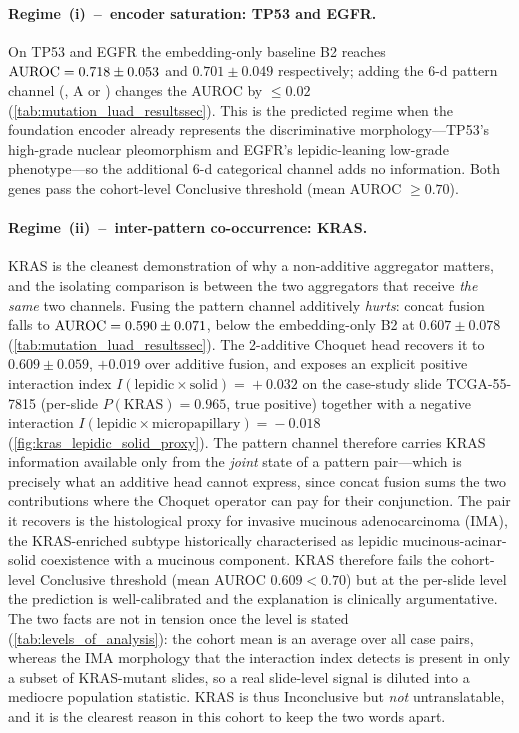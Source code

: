 \paragraph{Regime~(i)~--~encoder saturation: TP53 and EGFR.}
On TP53 and EGFR the embedding-only baseline B2 reaches
$\text{AUROC} = 0.718 \pm 0.053$ and $0.701 \pm 0.049$ respectively;
adding the 6-d pattern channel (\piabmil{}, A or \fcmil{}) changes
the AUROC by $\leq 0.02$ (\cref{tab:mutation_luad_resultssec}).
This is the predicted regime when the \ctranspath{} foundation
encoder already represents the discriminative morphology---TP53's
high-grade nuclear pleomorphism\cite{ahn2022tp53highgrade,mendoza2024tp53nuclear}
and EGFR's lepidic-leaning low-grade phenotype\cite{yoshizawa2013egfrmorph,li2025lepidicgenomics}---so
the additional 6-d categorical channel adds no information.
Both genes pass the cohort-level Conclusive threshold
(mean AUROC $\geq 0.70$).

\paragraph{Regime~(ii)~--~inter-pattern co-occurrence: KRAS.}
KRAS is the cleanest demonstration of why a non-additive aggregator
matters, and the isolating comparison is between the two aggregators
that receive \emph{the same} two channels.
Fusing the pattern channel additively \emph{hurts}: \piabmil{}
concat fusion falls to $\text{AUROC} = 0.590 \pm 0.071$, below the
embedding-only B2 at $0.607 \pm 0.078$
(\cref{tab:mutation_luad_resultssec}).
The 2-additive Choquet head recovers it to $0.609 \pm 0.059$,
${+}0.019$ over additive fusion, and exposes an explicit positive
interaction index
$I(\text{lepidic}\!\times\!\text{solid})\!=\!{+}0.032$ on the
case-study slide TCGA-55-7815 (per-slide
$P(\text{KRAS}) = 0.965$, true positive) together with a negative
interaction
$I(\text{lepidic}\!\times\!\text{micropapillary})\!=\!-0.018$
(\cref{fig:kras_lepidic_solid_proxy}).
The pattern channel therefore carries KRAS information available only
from the \emph{joint} state of a pattern pair---which is precisely
what an additive head cannot express, since concat fusion sums the two
contributions where the Choquet operator can pay for their
conjunction.
The pair it recovers is the histological proxy for invasive mucinous
adenocarcinoma (IMA), the KRAS-enriched subtype historically
characterised as lepidic mucinous-acinar-solid coexistence with a
mucinous component.\cite{shim2015krasmucinous,rekhtman2013krassolid,cha2017imapatterns,hwang2017nonlepidicima}
KRAS therefore fails the cohort-level Conclusive threshold
(mean AUROC $0.609 < 0.70$) but at the per-slide level the
prediction is well-calibrated and the explanation is
clinically argumentative.
The two facts are not in tension once the level is stated
(\cref{tab:levels_of_analysis}): the cohort mean is an average over
all case pairs, whereas the IMA morphology that the interaction
index detects is present in only a subset of KRAS-mutant slides, so
a real slide-level signal is diluted into a mediocre population
statistic.
KRAS is thus Inconclusive but \emph{not} untranslatable, and it is
the clearest reason in this cohort to keep the two words apart.

